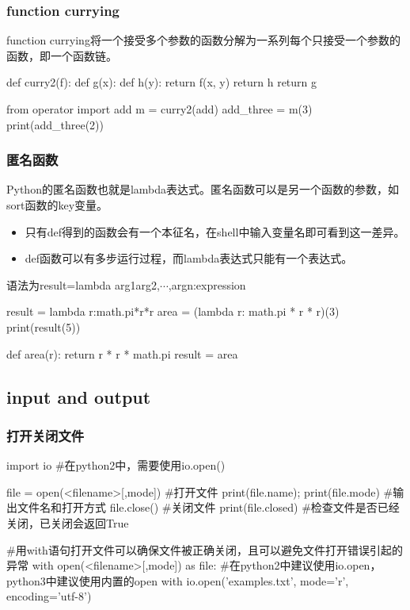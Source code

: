     \subsubsection{function currying}
      function currying将一个接受多个参数的函数分解为一系列每个只接受一个参数的函数，即一个函数链。
      \begin{codeblock}[language=python, caption={function currying}]
        def curry2(f):
          def g(x):
            def h(y):
              return f(x, y)
            return h
          return g
          
        from operator import add
        m = curry2(add)
        add_three = m(3)
        print(add_three(2))
      \end{codeblock}
  
    \subsubsection{匿名函数}
      Python的匿名函数也就是lambda表达式。匿名函数可以是另一个函数的参数，如sort函数的key变量。

      \begin{itemize}
        \item 只有def得到的函数会有一个本征名，在shell中输入变量名即可看到这一差异。
        \item def函数可以有多步运行过程，而lambda表达式只能有一个表达式。
      \end{itemize}

      语法为result=lambda \lbrack arg1\lbrack arg2,$\cdots$,argn\rbrack \rbrack:expression
      \begin{codeblock}[language=python, caption={lambda function}]
        result = lambda r:math.pi*r*r
        area = (lambda r: math.pi * r * r)(3)
        print(result(5))

        def area(r):
          return r * r * math.pi
        result = area
      \end{codeblock}

  \subsection{input and output}
    \subsubsection{打开关闭文件}
      \begin{codeblock}[language=python, caption={open and close files}]
        import io #在python2中，需要使用io.open()

        file = open(<filename>[,mode]) #打开文件
        print(file.name); print(file.mode) #输出文件名和打开方式
        file.close() #关闭文件
        print(file.closed) #检查文件是否已经关闭，已关闭会返回True

        #用with语句打开文件可以确保文件被正确关闭，且可以避免文件打开错误引起的异常
        with open(<filename>[,mode]) as file:
        #在python2中建议使用io.open，python3中建议使用内置的open 
        with io.open('examples.txt', mode='r', encoding='utf-8')
      \end{codeblock}

